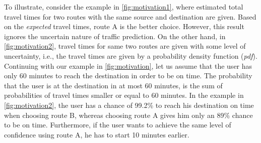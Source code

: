 % 
% 

To illustrate, consider the example in \cref{fig:motivation1}, where estimated total travel times for two routes with the same source and destination are given. Based on the \textit{expected} travel times, route A is the better choice. However, this result ignores the uncertain nature of traffic prediction. On the other hand, in \cref{fig:motivation2}, travel times for same two routes are given with some level of uncertainty, i.e., the travel times are given by a probability density function (\textit{pdf}). Continuing with our example in \cref{fig:motivation}, let us assume that the user has only 60 minutes to reach the destination in order to be on time. The probability that the user is at the destination in at most 60 minutes, is the sum of probabilities of travel times smaller or equal to 60 minutes. In the example in \cref{fig:motivation2}, the user has a chance of 99.2\% to reach his destination on time when choosing route B, whereas choosing route A gives him only an 89\% chance to be on time. Furthermore, if the user wants to achieve the same level of confidence using route A, he has to start 10 minutes earlier.

